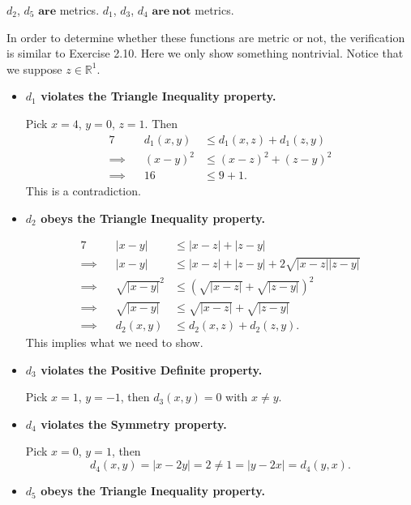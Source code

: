 \begin{Exercise}
	\begin{answer}
		$d_2$, $d_5$ $\mathbf{are}$ metrics.
		$d_1$, $d_3$, $d_4$ $\mathbf{are\ not}$ metrics.
	\end{answer}
	\begin{solution}
		In order to determine whether these functions are metric or not, the verification is similar to Exercise 2.10. Here we only show something nontrivial. Notice that we suppose $z\in\mathbb{R}^1$.
		
		\begin{itemize}
			\item \textbf{$d_1$ violates the Triangle Inequality property.}
			
			Pick $x=4$, $y=0$, $z=1$. Then
			\begin{alignat*}{7}
			\quad&& d_1(x,y) &\leq d_1(x,z) + d_1(z,y) \\
			\implies&& (x-y)^2 &\leq (x-z)^2 + (z-y)^2 \\
			\implies&& 16 &\leq 9 + 1.
			\end{alignat*}
			This is a contradiction.
			
			\item \textbf{$d_2$ obeys the Triangle Inequality property.}
		
			\begin{alignat*}{7}
			\quad&& |x-y| &\leq |x-z| + |z-y| \\
			\implies&& |x-y| &\leq |x-z| + |z-y| + 2\sqrt{|x-z| |z-y|} \\
			\implies&& \sqrt{|x-y|}^2 &\leq \left( \sqrt{|x-z|} + \sqrt{|z-y|} \right)^2 \\
			\implies&& \sqrt{|x-y|} &\leq \sqrt{|x-z|} + \sqrt{|z-y|} \\
			\implies&& d_2(x,y) &\leq d_2(x,z) + d_2(z,y).
			\end{alignat*}
			This implies what we need to show.
			
			\item \textbf{$d_3$ violates the Positive Definite property.}
			
			Pick $x=1$, $y=-1$, then $d_3(x,y) = 0$ with $x\neq y$.
			
			\item \textbf{$d_4$ violates the Symmetry property.}
			
			Pick $x=0$, $y=1$, then
			$$
			d_4(x,y) = |x-2y| = 2 \neq 1 = |y-2x| = d_4(y,x).
			$$
			
			\item \textbf{$d_5$ obeys the Triangle Inequality property.}
			

\end{itemize}
\end{solution}
\end{Exercise}
